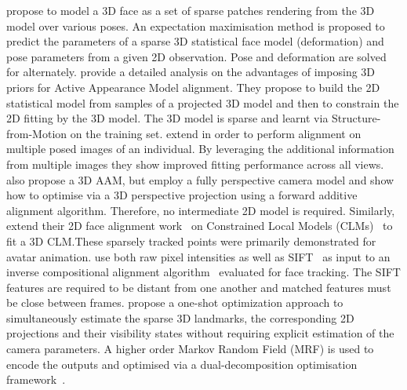 \citet{lie2006alignment} propose to model a 3D face as a set of sparse patches
rendering from the 3D model over various poses. An expectation maximisation
method is proposed to predict the parameters of a sparse 3D statistical face
model (deformation) and pose parameters from a given 2D observation. Pose
and deformation are solved for alternately.
\cite{Matthews:2007gb} provide a detailed analysis on the advantages
of imposing 3D priors for Active Appearance Model alignment. They propose to
build the 2D statistical model from samples of a projected 3D model and then
to constrain the 2D fitting by the 3D model. The 3D model is sparse and learnt
via Structure-from-Motion on the training set. \citet{Ramnath:2008jp} extend
\cite{Matthews:2007gb} in order to perform alignment on multiple posed
images of an individual. By leveraging the additional information from
multiple images they show improved fitting performance across all views.
\cite{Martins:2013hp} also propose a 3D AAM, but employ a fully perspective
camera model and show how to optimise via a 3D perspective projection
using a forward additive alignment algorithm. Therefore, no intermediate
2D model is required. Similarly, \citet{saragih2011real} extend their 2D
face alignment work~\cite{saragih2011deformable} on Constrained Local Models
(CLMs)~\cite{cristinacce2006feature} to fit a 3D CLM.\@ These sparsely
tracked points were primarily demonstrated for avatar animation.
\cite{Liao:2010fy} use both raw pixel intensities as well as
SIFT~\cite{lowe2004distinctive} as input to an inverse compositional alignment
algorithm~\cite{baker2004lucas} evaluated for face tracking. The SIFT features
are required to be distant from one another and matched features must be close
between frames.
\citet{Wang:2011kr} propose a one-shot optimization approach to simultaneously
estimate the sparse 3D landmarks, the corresponding 2D projections and their
visibility states without requiring explicit estimation of the camera
parameters. A higher order Markov Random Field (MRF) is used to encode the
outputs and optimised via a dual-decomposition optimisation
framework~\cite{komodakis2007mrf}.

